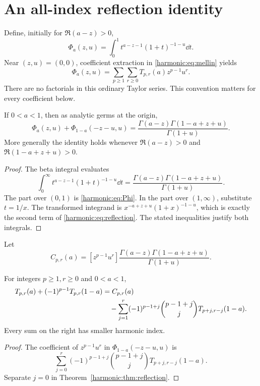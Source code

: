 \section{An all-index reflection identity}
\label{harmonic:sec:reflection}

Define, initially for $\Re(a-z)>0$,
\begin{equation}\label{harmonic:eq:Phi}
 \Phi_a(z,u)=\int_0^1 t^{a-z-1}(1+t)^{-1-u}\dd t.
\end{equation}
Near $(z,u)=(0,0)$, coefficient extraction in \eqref{harmonic:eq:mellin} yields
\begin{equation}\label{harmonic:eq:PhiTaylor}
 \Phi_a(z,u)=\sum_{p\ge1}\sum_{r\ge0}T_{p,r}(a)z^{p-1}u^r.
\end{equation}
There are no factorials in this ordinary Taylor series. This convention matters for every coefficient below.

\begin{theorem}[Reflection]\label{harmonic:thm:reflection}
If $0<a<1$, then as analytic germs at the origin,
\begin{equation}\label{harmonic:eq:reflection}
 \boxed{\quad
 \Phi_a(z,u)+\Phi_{1-a}(-z-u,u)
 =\frac{\Gamma(a-z)\Gamma(1-a+z+u)}{\Gamma(1+u)}.
 \quad}
\end{equation}
More generally the identity holds whenever
$\Re(a-z)>0$ and $\Re(1-a+z+u)>0$.
\end{theorem}
\begin{proof}
The beta integral evaluates
\[
 \int_0^\infty t^{a-z-1}(1+t)^{-1-u}\dd t
 =\frac{\Gamma(a-z)\Gamma(1-a+z+u)}{\Gamma(1+u)}.
\]
The part over $(0,1)$ is \eqref{harmonic:eq:Phi}. In the part over $(1,\infty)$, substitute $t=1/x$. The transformed integrand is
$x^{-a+z+u}(1+x)^{-1-u}$, which is exactly the second term of \eqref{harmonic:eq:reflection}. The stated inequalities justify both integrals.
\end{proof}

Let
\begin{equation}\label{harmonic:eq:C}
 C_{p,r}(a)=[z^{p-1}u^r]
 \frac{\Gamma(a-z)\Gamma(1-a+z+u)}{\Gamma(1+u)}.
\end{equation}

\begin{corollary}\label{harmonic:cor:triangular}
For integers $p\ge1,r\ge0$ and $0<a<1$,
\begin{align}\label{harmonic:eq:triangular}
 T_{p,r}(a)+(-1)^{p-1}T_{p,r}(1-a)
 &=C_{p,r}(a)\\
 &\quad-\sum_{j=1}^r(-1)^{p-1+j}
   \binom{p-1+j}{j}T_{p+j,r-j}(1-a).\notag
\end{align}
Every sum on the right has smaller harmonic index.
\end{corollary}
\begin{proof}
The coefficient of $z^{p-1}u^r$ in
$\Phi_{1-a}(-z-u,u)$ is
\[
 \sum_{j=0}^r(-1)^{p-1+j}\binom{p-1+j}{j}
                       T_{p+j,r-j}(1-a).
\]
Separate $j=0$ in Theorem~\ref{harmonic:thm:reflection}.
\end{proof}

